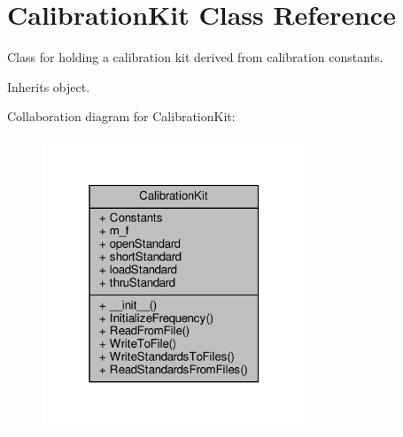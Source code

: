 \hypertarget{classSignalIntegrity_1_1Measurement_1_1CalKit_1_1CalibrationKit_1_1CalibrationKit}{}\section{Calibration\+Kit Class Reference}
\label{classSignalIntegrity_1_1Measurement_1_1CalKit_1_1CalibrationKit_1_1CalibrationKit}


Class for holding a calibration kit derived from calibration constants.  




Inherits object.



Collaboration diagram for Calibration\+Kit\+:
\nopagebreak
\begin{figure}[H]
\begin{center}
\leavevmode
\includegraphics[width=223pt]{classSignalIntegrity_1_1Measurement_1_1CalKit_1_1CalibrationKit_1_1CalibrationKit__coll__graph}
\end{center}
\end{figure}
